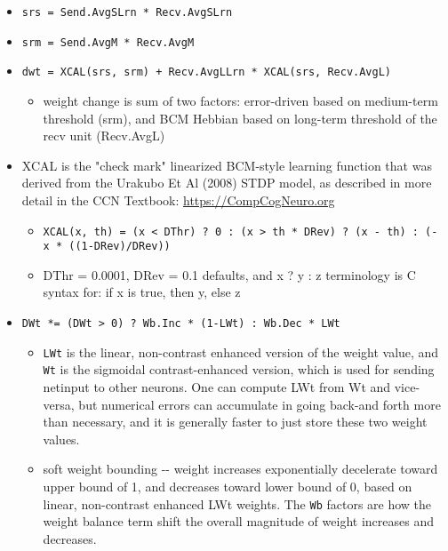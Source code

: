 \documentclass[10pt,letterpaper]{article}
\begin{document}
\begin{itemize}
  \item \texttt{srs\ =\ Send.AvgSLrn\ *\ Recv.AvgSLrn}

  \item \texttt{srm\ =\ Send.AvgM\ *\ Recv.AvgM}

  \item \texttt{dwt\ =\ XCAL(srs,\ srm)\ +\ Recv.AvgLLrn\ *\ XCAL(srs,\ Recv.AvgL)}

    \begin{itemize}
	
    \item
      weight change is sum of two factors: error-driven based on
      medium-term threshold (srm), and BCM Hebbian based on long-term
      threshold of the recv unit (Recv.AvgL)
    \end{itemize}
	
  \item
    XCAL is the "check mark" linearized BCM-style learning function that was derived from the Urakubo Et Al (2008) STDP model, as described in more detail in the CCN Textbook: \url{https://CompCogNeuro.org}

    \begin{itemize}
	
    \item
      \texttt{XCAL(x,\ th)\ =\ (x\ \textless{}\ DThr)\ ?\ 0\ :\ (x\ \textgreater{}\ th\ *\ DRev)\ ?\ (x\ -\ th)\ :\ (-x\ *\ ((1-DRev)/DRev))}
    \item
      DThr = 0.0001, DRev = 0.1 defaults, and x ? y : z terminology is C
      syntax for: if x is true, then y, else z
    \end{itemize}
	
  \item \texttt{DWt\ *=\ (DWt\ \textgreater{}\ 0)\ ?\ Wb.Inc\ *\ (1-LWt)\ :\ Wb.Dec\ *\ LWt}
	
    \begin{itemize}
	
    \item \texttt{LWt} is the linear, non-contrast enhanced version
    of the weight value, and \texttt{Wt} is the sigmoidal
    contrast-enhanced version, which is used for sending netinput to
    other neurons. One can compute LWt from Wt and vice-versa, but
    numerical errors can accumulate in going back-and forth more than
    necessary, and it is generally faster to just store these two weight
    values.
    \item
      soft weight bounding -\/- weight increases exponentially
      decelerate toward upper bound of 1, and decreases toward lower
      bound of 0, based on linear, non-contrast enhanced LWt weights.
      The \texttt{Wb} factors are how the weight balance term shift the
      overall magnitude of weight increases and decreases.
    \end{itemize}
	

\end{itemize}
\end{document}
